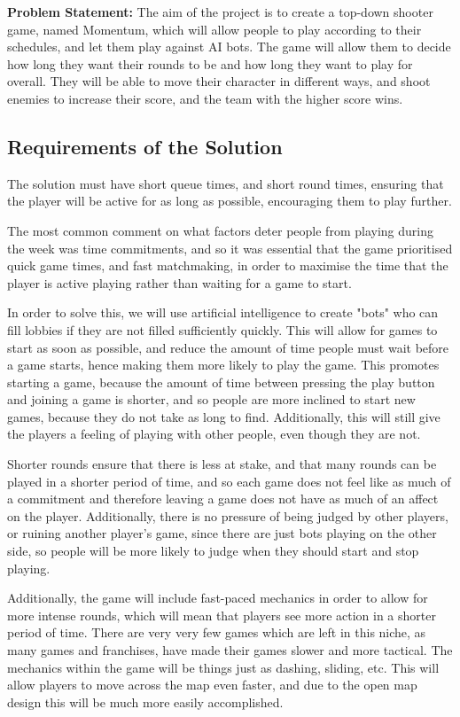 \vs
\textbf{Problem Statement: } The aim of the project is to create a top-down shooter game, named Momentum, which will allow people to play according to their schedules, and let them play against AI bots. The game will allow them to decide how long they want their rounds to be and how long they want to play for overall. They will be able to move their character in different ways, and shoot enemies to increase their score, and the team with the higher score wins.


\subsection{Requirements of the Solution}

The solution must have short queue times, and short round times, ensuring that the player will be active for as long as possible, encouraging them to play further.

\vs
The most common comment on what factors deter people from playing during the week was time commitments, and so it was essential that the game prioritised quick game times, and fast matchmaking, in order to maximise the time that the player is active playing rather than waiting for a game to start.

\vs
In order to solve this, we will use artificial intelligence to create "bots" who can fill lobbies if they are not filled sufficiently quickly. This will allow for games to start as soon as possible, and reduce the amount of time people must wait before a game starts, hence making them more likely to play the game. This promotes starting a game, because the amount of time between pressing the play button and joining a game is shorter, and so people are more inclined to start new games, because they do not take as long to find. Additionally, this will still give the players a feeling of playing with other people, even though they are not.

\vs
Shorter rounds ensure that there is less at stake, and that many rounds can be played in a shorter period of time, and so each game does not feel like as much of a commitment and therefore leaving a game does not have as much of an affect on the player. Additionally, there is no pressure of being judged by other players, or ruining another player's game, since there are just bots playing on the other side, so people will be more likely to judge when they should start and stop playing.

\vs
Additionally, the game will include fast-paced mechanics in order to allow for more intense rounds, which will mean that players see more action in a shorter period of time. There are very very few games which are left in this niche, as many games and franchises, have made their games slower and more tactical. The mechanics within the game will be things just as dashing, sliding, etc. This will allow players to move across the map even faster, and due to the open map design this will be much more easily accomplished. 

